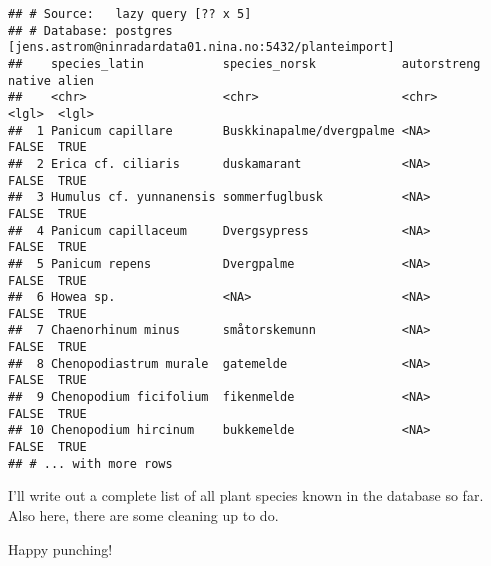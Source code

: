 \documentclass[]{article}
\newenvironment{Shaded}{\begin{snugshade}}{\end{snugshade}}
\newcommand{\DataTypeTok}[1]{\textcolor[rgb]{0.13,0.29,0.53}{#1}}
\newcommand{\KeywordTok}[1]{\textcolor[rgb]{0.13,0.29,0.53}{\textbf{#1}}}
\newcommand{\NormalTok}[1]{#1}
\newcommand{\OperatorTok}[1]{\textcolor[rgb]{0.81,0.36,0.00}{\textbf{#1}}}
\newcommand{\StringTok}[1]{\textcolor[rgb]{0.31,0.60,0.02}{#1}}
\begin{document}
\begin{verbatim}
## # Source:   lazy query [?? x 5]
## # Database: postgres [jens.astrom@ninradardata01.nina.no:5432/planteimport]
##    species_latin           species_norsk            autorstreng native alien
##    <chr>                   <chr>                    <chr>       <lgl>  <lgl>
##  1 Panicum capillare       Buskkinapalme/dvergpalme <NA>        FALSE  TRUE 
##  2 Erica cf. ciliaris      duskamarant              <NA>        FALSE  TRUE 
##  3 Humulus cf. yunnanensis sommerfuglbusk           <NA>        FALSE  TRUE 
##  4 Panicum capillaceum     Dvergsypress             <NA>        FALSE  TRUE 
##  5 Panicum repens          Dvergpalme               <NA>        FALSE  TRUE 
##  6 Howea sp.               <NA>                     <NA>        FALSE  TRUE 
##  7 Chaenorhinum minus      småtorskemunn            <NA>        FALSE  TRUE 
##  8 Chenopodiastrum murale  gatemelde                <NA>        FALSE  TRUE 
##  9 Chenopodium ficifolium  fikenmelde               <NA>        FALSE  TRUE 
## 10 Chenopodium hircinum    bukkemelde               <NA>        FALSE  TRUE 
## # ... with more rows
\end{verbatim}

I'll write out a complete list of all plant species known in the
database so far. Also here, there are some cleaning up to do.

\begin{Shaded}
\end{Shaded}

Happy punching!
\end{document}
